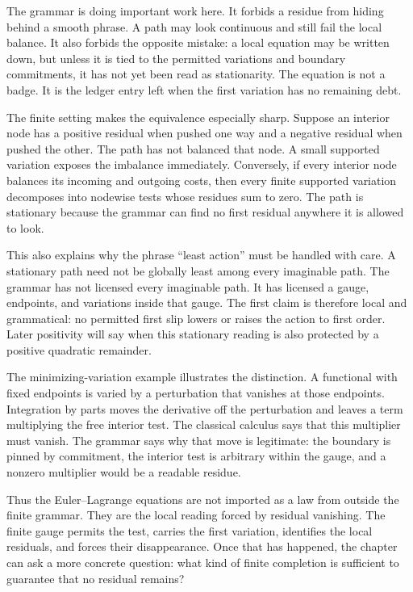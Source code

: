 The grammar is doing important work here. It forbids a residue from hiding
behind a smooth phrase. A path may look continuous and still fail the local
balance. It also forbids the opposite mistake: a local equation may be
written down, but unless it is tied to the permitted variations and boundary
commitments, it has not yet been read as stationarity. The equation is not a
badge. It is the ledger entry left when the first variation has no remaining
debt.

The finite setting makes the equivalence especially sharp. Suppose an
interior node has a positive residual when pushed one way and a negative
residual when pushed the other. The path has not balanced that node. A
small supported variation exposes the imbalance immediately. Conversely, if
every interior node balances its incoming and outgoing costs, then every
finite supported variation decomposes into nodewise tests whose residues
sum to zero. The path is stationary because the grammar can find no first
residual anywhere it is allowed to look.

This also explains why the phrase ``least action'' must be handled with
care. A stationary path need not be globally least among every imaginable
path. The grammar has not licensed every imaginable path. It has licensed a
gauge, endpoints, and variations inside that gauge. The first claim is
therefore local and grammatical: no permitted first slip lowers or raises
the action to first order. Later positivity will say when this stationary
reading is also protected by a positive quadratic remainder.

The minimizing-variation example illustrates the distinction. A functional
with fixed endpoints is varied by a perturbation that vanishes at those
endpoints. Integration by parts moves the derivative off the perturbation
and leaves a term multiplying the free interior test. The classical
calculus says that this multiplier must vanish. The grammar says why that
move is legitimate: the boundary is pinned by commitment, the interior test
is arbitrary within the gauge, and a nonzero multiplier would be a readable
residue.

Thus the Euler--Lagrange equations are not imported as a law from outside
the finite grammar. They are the local reading forced by residual
vanishing. The finite gauge permits the test, carries the first variation,
identifies the local residuals, and forces their disappearance. Once that
has happened, the chapter can ask a more concrete question: what kind of
finite completion is sufficient to guarantee that no residual remains?
